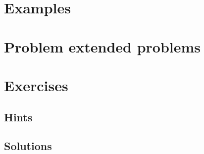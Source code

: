 \section{Examples}



\section{Problem extended problems}






















\section{Exercises}


\ifdefined\IncludeExerciseHints
\subsection*{Hints}

\fi

\ifdefined\IncludeExerciseSolutions
\subsection*{Solutions}

\fi

